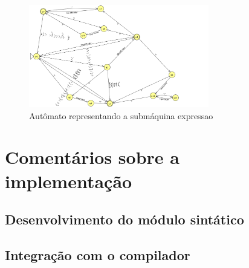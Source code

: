 \documentclass[12pt,oneside,a4paper,english]{abntex2}
\begin{document}
      \begin{figure}[H]
        \caption{Autômato representando a submáquina expressao}
        \centering
          \includegraphics[width=0.7\textwidth]{../1-linguagem/notacoes/JFLAP/expressao/expressao.png}
      \end{figure}

\chapter{Comentários sobre a implementação}

  \section{Desenvolvimento do módulo sintático}

  \section{Integração com o compilador}
\end{document}

